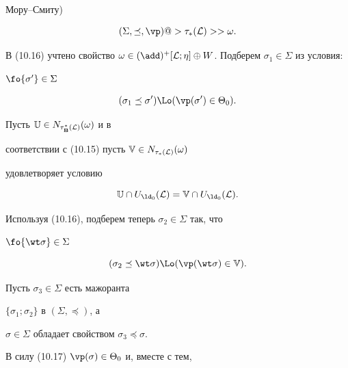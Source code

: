 \begin{pf}
Мору--Смиту)


\begin{equation}


(\Sigma,\preceq,\vp) @>{{\tau_*}({\cal L})}>> \omega.


\end{equation}





В (10.16) учтено свойство $\omega \in {(\add)^+}[{\cal L};\eta]


\oplus W$. Подберем ${{\sigma}_1} \in \Sigma$ из условия:


$\fo{{\sigma}'} \in \Sigma$


\begin{equation}


({{\sigma}_1} \preceq {\sigma}') \Lo


({\vp}({\sigma}') \in {{\Theta}_0}).


\end{equation}


Пусть ${\Bbb U} \in {N_{{\tau_{\bold B}^*}({\cal L})}}(\omega)$ и в


соответствии с (10.15) пусть ${\Bbb V} \in {N_{{\tau_*}({\cal L})}}(\omega)$


удовлетворяет условию


$$


{\Bbb U} \cap {U_{{\ld}_0}}({\cal L}) = {\Bbb V} \cap


{U_{{\ld}_0}}({\cal L}).


$$


Используя (10.16), подберем теперь ${{\sigma}_2} \in \Sigma$ так, что


$\fo{\wt \sigma} \in \Sigma$


\begin{equation}


({{\sigma}_2} \preceq {\wt


\sigma}) \Lo ({\vp}({\wt \sigma}) \in {\Bbb V}).


\end{equation}





Пусть ${{\sigma}_3} \in \Sigma$ есть мажоранта


$\{{{\sigma}_1};{{\sigma}_2}\}$ в $(\Sigma,\preceq)$, а


$\sigma \in \Sigma$ обладает свойством ${{\sigma}_3} \preceq \sigma$.


В силу (10.17)\; ${{\vp}(\sigma)} \in {{\Theta}_0}$ и, вместе с тем,



\end{pf}
